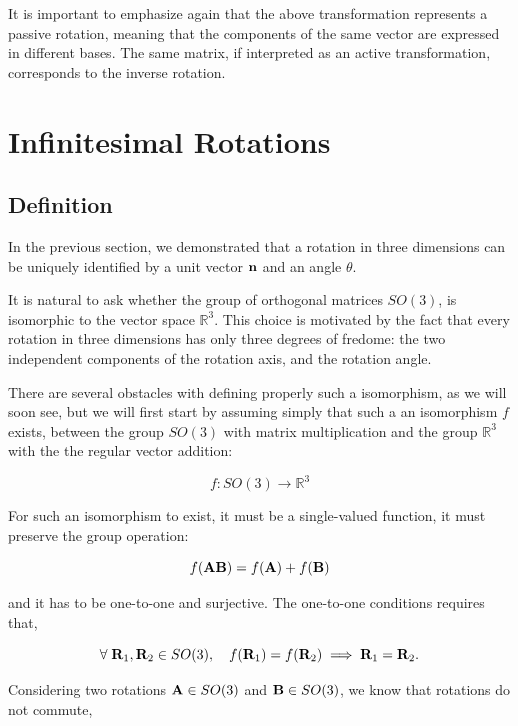 \documentclass[12pt]{article}
\begin{document}
It is important to emphasize again that the above transformation represents a passive
rotation, meaning that the components of the same vector are expressed in different bases.
The same matrix, if interpreted as an active transformation, corresponds to the inverse rotation.





\section{Infinitesimal Rotations}

\subsection{Definition}

In the previous section, we demonstrated that a rotation in three dimensions can be uniquely
identified by a unit vector $\vb{n}$ and an angle $\theta$.

It is natural to ask
whether the group of orthogonal matrices $SO(3)$, is isomorphic to the vector space
$\mathbb{R}^3$. This choice is motivated by the fact that every rotation in three dimensions has only three degrees of
fredome:  the two independent components of the  rotation axis, and the rotation angle.\par

There are several obstacles with defining properly such a isomorphism, as we will soon see, but we will first start by assuming
simply that such a an isomorphism $f$ exists, between the group $SO(3)$ with matrix multiplication
and the group $\mathbb{R}^3$ with the the regular vector addition:

\[
  f: SO(3) \to \mathbb{R}^3
\]

For such an isomorphism to exist, it must be a single-valued function, it must preserve the group operation:

\[
  f(\vb{A}\vb{B}) = f(\vb{A}) + f(\vb{B})
\]

and it has to be one-to-one and surjective. The one-to-one conditions requires that,

\[
  \forall\; \vb{R}_1, \vb{R}_2 \in SO(3),\quad
  f(\vb{R}_1) = f(\vb{R}_2) \implies \vb{R}_1 = \vb{R}_2.
\]

Considering two rotations $\vb{A} \in SO(3)$ and $\vb{B} \in SO(3)$, we know that rotations
do not commute,
\end{document}
